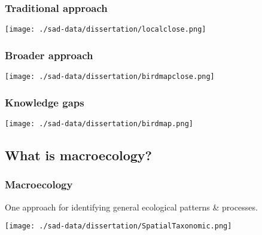 \documentclass[14pt]{beamer}
\begin{document}
\begin{frame}[t]
\frametitle{Traditional approach}
\vspace{-7pt}
\begin{center}
\texttt{[image: ./sad-data/dissertation/localclose.png]}
\end{center}
\end{frame}


\begin{frame}[t]
\frametitle{Broader approach}
\vspace{-7pt}
\begin{center}
\texttt{[image: ./sad-data/dissertation/birdmapclose.png]}
\end{center}
\end{frame}

\begin{frame}[t]
\frametitle{Knowledge gaps}
\vspace{-7pt}
\begin{center}
\texttt{[image: ./sad-data/dissertation/birdmap.png]}
\end{center}
\end{frame}

\subsection{What is macroecology?}
\begin{frame}[t]
\frametitle{Macroecology}
\normalsize One approach for identifying general ecological patterns \& processes.
\begin{center}
\texttt{[image: ./sad-data/dissertation/SpatialTaxonomic.png]}
\end{center}
\end{frame}
\end{document}
